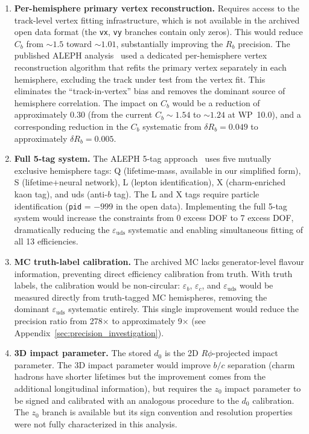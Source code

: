 \documentclass[11pt,a4paper]{article}
\begin{document}
\begin{enumerate}
\item \textbf{Per-hemisphere primary vertex reconstruction.} Requires access to the
track-level vertex fitting infrastructure, which is not available in the archived
open data format (the \texttt{vx}, \texttt{vy} branches contain only zeros). This
would reduce $C_b$ from $\sim 1.5$ toward $\sim 1.01$, substantially improving the
$R_b$ precision. The published ALEPH analysis~\cite{ALEPH:Rb:1996} used a dedicated
per-hemisphere vertex reconstruction algorithm that refits the primary vertex
separately in each hemisphere, excluding the track under test from the vertex fit.
This eliminates the ``track-in-vertex'' bias and removes the dominant source of
hemisphere correlation. The impact on $C_b$ would be a reduction of approximately
0.30 (from the current $C_b \sim 1.54$ to $\sim 1.24$ at WP~10.0), and a corresponding
reduction in the $C_b$ systematic from $\delta R_b = 0.049$ to approximately
$\delta R_b = 0.005$.

\item \textbf{Full 5-tag system.} The ALEPH 5-tag approach~\cite{ALEPH:Rb:1996}
uses five mutually exclusive hemisphere tags: Q (lifetime-mass, available in our
simplified form), S (lifetime+neural network), L (lepton identification), X
(charm-enriched kaon tag), and uds (anti-$b$ tag). The L and X tags require
particle identification (\texttt{pid} = $-999$ in the open data). Implementing the
full 5-tag system would increase the constraints from 0 excess DOF to 7 excess DOF,
dramatically reducing the $\varepsilon_\mathrm{uds}$ systematic and enabling
simultaneous fitting of all 13 efficiencies.

\item \textbf{MC truth-label calibration.} The archived MC lacks generator-level
flavour information, preventing direct efficiency calibration from truth. With truth
labels, the calibration would be non-circular: $\varepsilon_b$, $\varepsilon_c$, and
$\varepsilon_\mathrm{uds}$ would be measured directly from truth-tagged MC
hemispheres, removing the dominant $\varepsilon_\mathrm{uds}$ systematic entirely.
This single improvement would reduce the precision ratio from 278$\times$ to
approximately 9$\times$ (see Appendix~\ref{sec:precision_investigation}).

\item \textbf{3D impact parameter.} The stored $d_0$ is the 2D $R\phi$-projected
impact parameter. The 3D impact parameter would improve $b/c$ separation (charm
hadrons have shorter lifetimes but the improvement comes from the additional
longitudinal information), but requires the $z_0$ impact parameter to be signed and
calibrated with an analogous procedure to the $d_0$ calibration. The $z_0$ branch
is available but its sign convention and resolution properties were not fully
characterized in this analysis.


\end{enumerate}
\end{document}
